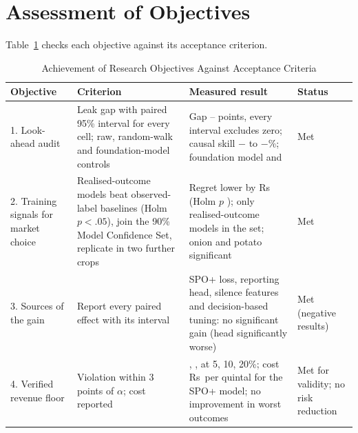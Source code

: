 \documentclass{ieeeaccess}
\newcommand{\Rs}{Rs\,}
\begin{document}
\begin{table}[!t]
\caption{Generalisation to Other Crops (Number of Yards in Brackets; Revenue in Rs per Quintal)}
\label{tab:crops}
\centering
\setlength{\tabcolsep}{5pt}
\resizebox{0.78\textwidth}{!}{}
\par\vspace{2pt}{\footnotesize Heuristic: highest price yesterday. LGBM-obs and LGBM-real: LightGBM on observed and on realised labels. Label effect: regret difference, with 95\% interval.\par}
\end{table}

\section{Assessment of Objectives}
\label{sec:objectives}
Table~\ref{tab:objectives} checks each objective against its acceptance criterion.

\begin{table}[!t]
\caption{Achievement of Research Objectives Against Acceptance Criteria}
\label{tab:objectives}
\centering
\setlength{\tabcolsep}{4pt}
\begin{tabular}{p{3.0cm}p{4.8cm}p{6.6cm}p{1.6cm}}
\toprule
Objective & Criterion & Measured result & Status\\
\midrule
1. Look-ahead audit & Leak gap with paired 95\% interval for every cell; raw, random-walk and foundation-model controls & Gap \LeakGapLo{}--\LeakGapHi{} points, every interval excludes zero; causal skill $-$\CauLoAbs{} to $-$\CauHiAbs{}\%; foundation model \FoundA{} and \FoundB{} & Met\\
2. Training signals for market choice & Realised-outcome models beat observed-label baselines (Holm $p<.05$), join the 90\% Model Confidence Set, replicate in two further crops & Regret lower by \Rs\LabelDAbs{} (Holm $p$ \LabelP{}); only realised-outcome models in the set; onion and potato significant & Met\\
3. Sources of the gain & Report every paired effect with its interval & SPO+ loss, reporting head, silence features and decision-based tuning: no significant gain (head significantly worse) & Met (negative results)\\
4. Verified revenue floor & Violation within 3 points of $\alpha$; cost reported & \ViolFive{}, \ViolTen{}, \ViolTwenty{} at 5, 10, 20\%; cost \Rs\FloorCost{} per quintal for the SPO+ model; no improvement in worst outcomes & Met for validity; no risk reduction\\
\bottomrule
\end{tabular}
\end{table}
\end{document}
